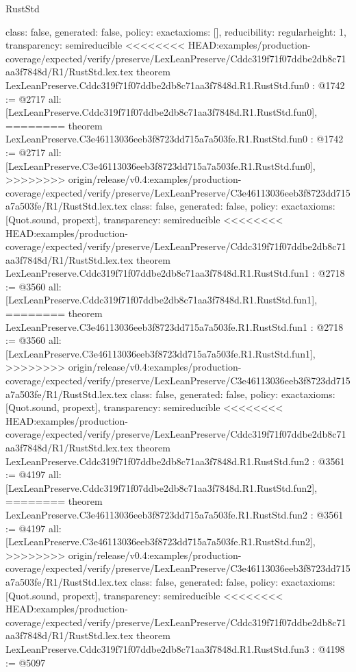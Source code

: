 \begin{lexlean}{RustStd}
\begin{coremodule}
{\begin{coremodule}
{{{  class: false,
  generated: false,
  policy: exact{axioms: []},
  reducibility: regular{height: 1},
  transparency: semireducible
}
<<<<<<<< HEAD:examples/production-coverage/expected/verify/preserve/LexLeanPreserve/Cddc319f71f07ddbe2db8c71aa3f7848d/R1/RustStd.lex.tex
theorem LexLeanPreserve.Cddc319f71f07ddbe2db8c71aa3f7848d.R1.RustStd.fun0 : @1742 := @2717 {
  all: [LexLeanPreserve.Cddc319f71f07ddbe2db8c71aa3f7848d.R1.RustStd.fun0],
========
theorem LexLeanPreserve.C3e46113036eeb3f8723dd715a7a503fe.R1.RustStd.fun0 : @1742 := @2717 {
  all: [LexLeanPreserve.C3e46113036eeb3f8723dd715a7a503fe.R1.RustStd.fun0],
>>>>>>>> origin/release/v0.4:examples/production-coverage/expected/verify/preserve/LexLeanPreserve/C3e46113036eeb3f8723dd715a7a503fe/R1/RustStd.lex.tex
  class: false,
  generated: false,
  policy: exact{axioms: [Quot.sound, propext]},
  transparency: semireducible
}
<<<<<<<< HEAD:examples/production-coverage/expected/verify/preserve/LexLeanPreserve/Cddc319f71f07ddbe2db8c71aa3f7848d/R1/RustStd.lex.tex
theorem LexLeanPreserve.Cddc319f71f07ddbe2db8c71aa3f7848d.R1.RustStd.fun1 : @2718 := @3560 {
  all: [LexLeanPreserve.Cddc319f71f07ddbe2db8c71aa3f7848d.R1.RustStd.fun1],
========
theorem LexLeanPreserve.C3e46113036eeb3f8723dd715a7a503fe.R1.RustStd.fun1 : @2718 := @3560 {
  all: [LexLeanPreserve.C3e46113036eeb3f8723dd715a7a503fe.R1.RustStd.fun1],
>>>>>>>> origin/release/v0.4:examples/production-coverage/expected/verify/preserve/LexLeanPreserve/C3e46113036eeb3f8723dd715a7a503fe/R1/RustStd.lex.tex
  class: false,
  generated: false,
  policy: exact{axioms: [Quot.sound, propext]},
  transparency: semireducible
}
<<<<<<<< HEAD:examples/production-coverage/expected/verify/preserve/LexLeanPreserve/Cddc319f71f07ddbe2db8c71aa3f7848d/R1/RustStd.lex.tex
theorem LexLeanPreserve.Cddc319f71f07ddbe2db8c71aa3f7848d.R1.RustStd.fun2 : @3561 := @4197 {
  all: [LexLeanPreserve.Cddc319f71f07ddbe2db8c71aa3f7848d.R1.RustStd.fun2],
========
theorem LexLeanPreserve.C3e46113036eeb3f8723dd715a7a503fe.R1.RustStd.fun2 : @3561 := @4197 {
  all: [LexLeanPreserve.C3e46113036eeb3f8723dd715a7a503fe.R1.RustStd.fun2],
>>>>>>>> origin/release/v0.4:examples/production-coverage/expected/verify/preserve/LexLeanPreserve/C3e46113036eeb3f8723dd715a7a503fe/R1/RustStd.lex.tex
  class: false,
  generated: false,
  policy: exact{axioms: [Quot.sound, propext]},
  transparency: semireducible
}
<<<<<<<< HEAD:examples/production-coverage/expected/verify/preserve/LexLeanPreserve/Cddc319f71f07ddbe2db8c71aa3f7848d/R1/RustStd.lex.tex
theorem LexLeanPreserve.Cddc319f71f07ddbe2db8c71aa3f7848d.R1.RustStd.fun3 : @4198 := @5097 {
}}}}}}
\end{coremodule}}
\end{coremodule}
\end{lexlean}
